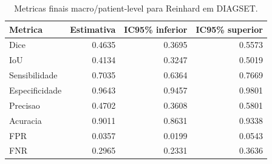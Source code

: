 \begin{table}[!htb]
\centering
\caption{Metricas finais macro/patient-level para Reinhard em DIAGSET.}
\label{tab:results_diagset-macro-reinhard}
\small
\begin{tabular}{lrrr}
\toprule
Metrica & Estimativa & IC95\% inferior & IC95\% superior \\
\midrule
Dice & 0.4635 & 0.3695 & 0.5573 \\
IoU & 0.4134 & 0.3247 & 0.5019 \\
Sensibilidade & 0.7035 & 0.6364 & 0.7669 \\
Especificidade & 0.9643 & 0.9457 & 0.9801 \\
Precisao & 0.4702 & 0.3608 & 0.5801 \\
Acuracia & 0.9011 & 0.8631 & 0.9338 \\
FPR & 0.0357 & 0.0199 & 0.0543 \\
FNR & 0.2965 & 0.2331 & 0.3636 \\
\bottomrule
\end{tabular}
\end{table}
